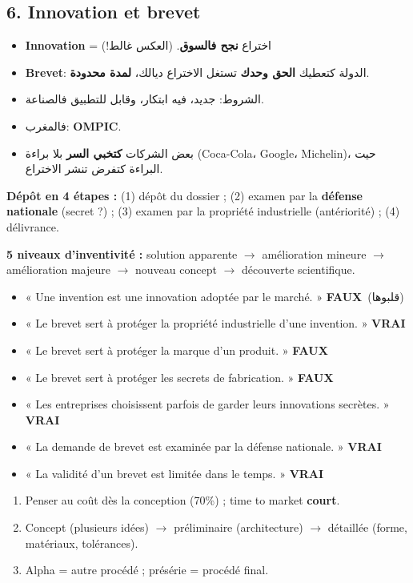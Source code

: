 \documentclass[11pt,a4paper]{article}
\newcommand{\ar}[1]{\textarabic{#1}}
\newcommand{\fr}[1]{\textfrench{#1}}
\newcommand{\vrai}{\textcolor{vert}{\textbf{VRAI}}}
\newcommand{\faux}{\textcolor{rouge}{\textbf{FAUX}}}
\begin{document}
\subsection*{6. Innovation et brevet}
\par\begin{Arabic}
\begin{itemize}
\item \textbf{\fr{Innovation}} = اختراع \textbf{نجح فالسوق}. (العكس غالط!)
\item \textbf{\fr{Brevet}}: الدولة كتعطيك \textbf{الحق وحدك} تستغل الاختراع ديالك، \textbf{لمدة محدودة}.
\item الشروط: جديد، فيه ابتكار، وقابل للتطبيق فالصناعة.
\item فالمغرب: \textbf{\fr{OMPIC}}.
\item بعض الشركات \textbf{كتخبي السر} بلا براءة (\fr{Coca-Cola}، \fr{Google}، \fr{Michelin})، حيت البراءة كتفرض تنشر الاختراع.
\end{itemize}
\end{Arabic}
\textbf{Dépôt en 4 étapes :} (1) dépôt du dossier ; (2) examen par la \textbf{défense nationale} (secret ?) ; (3) examen par la propriété industrielle (antériorité) ; (4) délivrance.

\textbf{5 niveaux d'inventivité :} solution apparente $\rightarrow$ amélioration mineure $\rightarrow$ amélioration majeure $\rightarrow$ nouveau concept $\rightarrow$ découverte scientifique.

\begin{piege}
\begin{itemize}
\item « Une invention est une innovation adoptée par le marché. » \faux \ \ar{(قلبوها)}
\item « Le brevet sert à protéger la propriété industrielle d'une invention. » \vrai
\item « Le brevet sert à protéger la marque d'un produit. » \faux
\item « Le brevet sert à protéger les secrets de fabrication. » \faux
\item « Les entreprises choisissent parfois de garder leurs innovations secrètes. » \vrai
\item « La demande de brevet est examinée par la défense nationale. » \vrai
\item « La validité d'un brevet est limitée dans le temps. » \vrai
\end{itemize}
\end{piege}

\begin{resume}
\begin{enumerate}
\item Penser au coût dès la conception (70\%) ; time to market \textbf{court}.
\item Concept (plusieurs idées) $\rightarrow$ préliminaire (architecture) $\rightarrow$ détaillée (forme, matériaux, tolérances).
\item Alpha = autre procédé ; présérie = procédé final.
\end{enumerate}
\end{resume}
\end{document}
